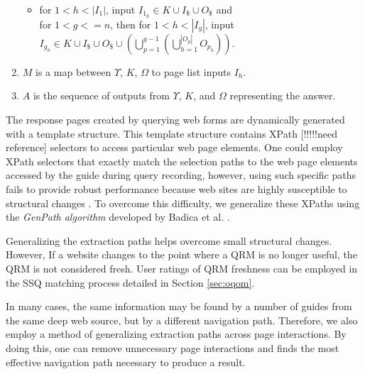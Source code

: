 \begin{enumerate}
\begin{itemize}
\item for $1 < h < \left| I_1 \right|$, input $I_{1_h} \in K \cup
  I_{\$} \cup O_{\$}$ and \\ for $1 < g <= n$, then for $1 < h <
  \left| I_g \right|$, input $I_{g_h} \in K \cup I_{\$} \cup O_{\$}
  \cup \left( \bigcup^{g-1}_{p=1} \left(
  \bigcup^{\left|O_p\right|}_{h=1}O_{p_h} \right)\right)$.
\end{itemize}

\item $M$ is a map between $\Upsilon$, $K$, $\Omega$ to page list inputs $I_h$.

\item $A$ is the sequence of outputs from $\Upsilon$, $K$, and
  $\Omega$ representing the answer.

\end{enumerate}



The response pages created by querying web forms are dynamically
generated with a template structure. This template structure contains
XPath [!!!!!need reference] selectors to access particular web page
elements.  One could employ XPath selectors that exactly match the
selection paths to the web page elements accessed by the guide during
query recording, however, using such specific paths fails to provide
robust performance because web sites are highly susceptible to
structural changes \cite{TanZMG07}.  To overcome this difficulty, we
generalize these XPaths using the \emph{GenPath algorithm} developed by
Badica et al. \cite{Badica06}.

Generalizing the extraction paths helps overcome small structural
changes. However, If a website changes to the point where a QRM is no
longer useful, the QRM is not considered fresh. User ratings of QRM
freshness can be employed in the SSQ matching process detailed in
Section \ref{sec:oqom}.

In many cases, the same information may be found by a number of guides
from the same deep web source, but by a different navigation path.
Therefore, we also employ a method of generalizing extraction paths
across page interactions. By doing this, one can remove unnecessary
page interactions and finds the most effective navigation path
necessary to produce a result.
